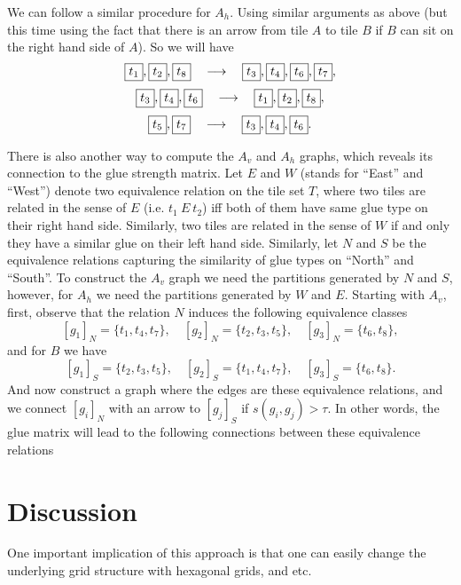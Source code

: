 \documentclass[11pt,a4paper]{article}
\newcommand{\tile}[1]{\fbox{\ensuremath{#1}}}
\theoremstyle{definition}
\theoremstyle{remark}
\theoremstyle{definition}
\begin{document}
	We can follow a similar procedure for $ A_h $. Using similar arguments as above (but this time using the fact that there is an arrow from tile $ A $ to tile $ B $ if $ B $ can sit on the right hand side of $ A $). So we will have
	\[ \tile{t_1},\tile{t_2},\tile{t_8} \quad\longrightarrow\quad \tile{t_3},\tile{t_4},\tile{t_6},\tile{t_7}, \]
	\[ \tile{t_3},\tile{t_4},\tile{t_6} \quad\longrightarrow\quad \tile{t_1},\tile{t_2},\tile{t_8}, \]
	\[ \tile{t_5},\tile{t_7} \quad\longrightarrow\quad \tile{t_3},\tile{t_4},\tile{t_6}. \]
	
	There is also another way to compute the $ A_v $ and $ A_h $ graphs, which reveals its connection to the glue strength matrix.  Let $ E $ and $ W $ (stands for ``East'' and ``West'') denote two equivalence relation on the tile set $ T $, where two tiles are related in the sense of $ E $ (i.e. $ t_1\ E\ t_2 $) iff both of them have same glue type on their right hand side. Similarly, two tiles are related in the sense of $ W $ if and only they have a similar glue on their left hand side. Similarly, let $ N $ and $ S $ be the equivalence relations capturing the similarity of glue types on ``North'' and ``South''. To construct the $ A_v $ graph we need the partitions generated by $ N $ and $ S $, however, for $ A_h $ we need the partitions generated by $ W $ and $ E $. Starting with $ A_v $, first, observe that the relation $ N $ induces the following equivalence classes
	\[ [g_1]_N = \{t_1,t_4,t_7\}, \quad [g_2]_N = \{t_2,t_3,t_5\}, \quad [g_3]_N = \{t_6, t_8\}, \] 
	and for $ B $ we have
	\[ [g_1]_S = \{t_2,t_3,t_5\}, \quad [g_2]_S = \{t_1,t_4,t_7\}, \quad [g_3]_S = \{t_6,t_8\}. \]
	And now construct a graph where the edges are these equivalence relations, and we connect $ [g_i]_N $ with an arrow to $ [g_j]_S $ if $ s(g_i,g_j) > \tau $. In other words, the glue matrix will lead to the following connections between these equivalence relations
	

	
	
	\section{Discussion}
	One important implication of this approach is that one can easily change the underlying grid structure with hexagonal grids, and etc.
	
	
	
\end{document}
